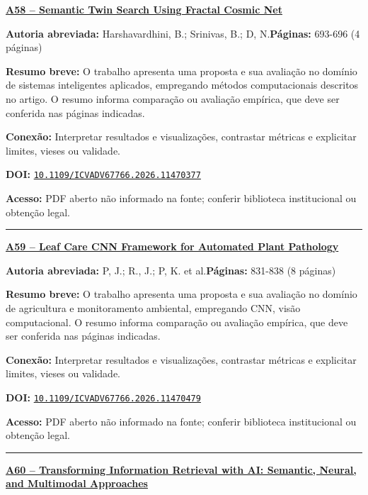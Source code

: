 \documentclass[10pt,a4paper]{article}
\begin{document}
{\large\bfseries\href{https://doi.org/10.1109/ICVADV67766.2026.11470377}{A58 -- Semantic Twin Search Using Fractal Cosmic Net}}\par\smallskip
\textbf{Autoria abreviada:} Harshavardhini, B.; Srinivas, B.; D, N.\quad \textbf{Páginas:} 693-696 (4 páginas)\par
\textbf{Resumo breve:} O trabalho apresenta uma proposta e sua avaliação no domínio de sistemas inteligentes aplicados, empregando métodos computacionais descritos no artigo. O resumo informa comparação ou avaliação empírica, que deve ser conferida nas páginas indicadas.\par
\textbf{Conexão:} Interpretar resultados e visualizações, contrastar métricas e explicitar limites, vieses ou validade.\par
\textbf{DOI:} \href{https://doi.org/10.1109/ICVADV67766.2026.11470377}{\nolinkurl{10.1109/ICVADV67766.2026.11470377}}\par
\textbf{Acesso:} PDF aberto não informado na fonte; conferir biblioteca institucional ou obtenção legal.\par
\noindent\rule{\textwidth}{0.35pt}
\par\medskip\noindent
{\large\bfseries\href{https://doi.org/10.1109/ICVADV67766.2026.11470479}{A59 -- Leaf Care CNN Framework for Automated Plant Pathology}}\par\smallskip
\textbf{Autoria abreviada:} P, J.; R., J.; P, K. et al.\quad \textbf{Páginas:} 831-838 (8 páginas)\par
\textbf{Resumo breve:} O trabalho apresenta uma proposta e sua avaliação no domínio de agricultura e monitoramento ambiental, empregando CNN, visão computacional. O resumo informa comparação ou avaliação empírica, que deve ser conferida nas páginas indicadas.\par
\textbf{Conexão:} Interpretar resultados e visualizações, contrastar métricas e explicitar limites, vieses ou validade.\par
\textbf{DOI:} \href{https://doi.org/10.1109/ICVADV67766.2026.11470479}{\nolinkurl{10.1109/ICVADV67766.2026.11470479}}\par
\textbf{Acesso:} PDF aberto não informado na fonte; conferir biblioteca institucional ou obtenção legal.\par
\noindent\rule{\textwidth}{0.35pt}
\par\medskip\noindent
{\large\bfseries\href{https://doi.org/10.1109/ICVADV67766.2026.11470404}{A60 -- Transforming Information Retrieval with AI: Semantic, Neural, and Multimodal Approaches}}\par\smallskip
\end{document}
